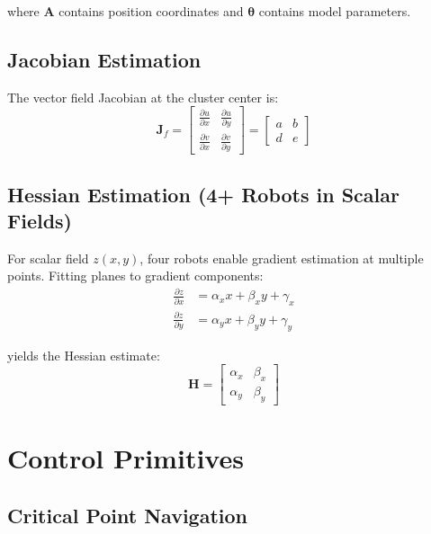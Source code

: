 \documentclass{article}
\begin{document}
where $\mathbf{A}$ contains position coordinates and $\boldsymbol{\theta}$ contains model parameters.

\subsection{Jacobian Estimation}

The vector field Jacobian at the cluster center is:
\begin{equation}
\mathbf{J}_f = \begin{bmatrix} \frac{\partial u}{\partial x} & \frac{\partial u}{\partial y} \\ \frac{\partial v}{\partial x} & \frac{\partial v}{\partial y} \end{bmatrix} = \begin{bmatrix} a & b \\ d & e \end{bmatrix}
\end{equation}

\subsection{Hessian Estimation (4+ Robots in Scalar Fields)}

For scalar field $z(x,y)$, four robots enable gradient estimation at multiple points. Fitting planes to gradient components:
\begin{align}
\frac{\partial z}{\partial x} &= \alpha_x x + \beta_x y + \gamma_x \\
\frac{\partial z}{\partial y} &= \alpha_y x + \beta_y y + \gamma_y
\end{align}

yields the Hessian estimate:
\begin{equation}
\mathbf{H} = \begin{bmatrix} \alpha_x & \beta_x \\ \alpha_y & \beta_y \end{bmatrix}
\end{equation}

\section{Control Primitives}

\subsection{Critical Point Navigation}
\end{document}
